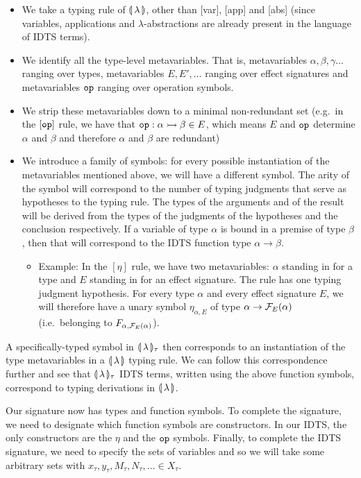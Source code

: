 \begin{itemize}
\item We take a typing rule of $\llparenthesis \, \lambda \, \rrparenthesis$, other than [var], [app]
  and [abs] (since variables, applications and $\lambda$-abstractions are
  already present in the language of IDTS terms).
\item We identify all the type-level metavariables. That is, metavariables
  $\alpha, \beta, \gamma \ldots$ ranging over types, metavariables
  $E, E', \ldots$ ranging over effect signatures and metavariables
  $\mathtt{op}$ ranging over operation symbols.
\item We strip these metavariables down to a minimal non-redundant set
  (e.g.\ in the $[\mathtt{op}]$ rule, we have that
  $\mathtt{op} : \alpha \rightarrowtail \beta \in E$, which means $E$ and $\mathtt{op}$
  determine $\alpha$ and $\beta$ and therefore $\alpha$ and $\beta$ are
  redundant)
\item We introduce a family of symbols: for every possible instantiation of
  the metavariables mentioned above, we will have a different symbol. The
  arity of the symbol will correspond to the number of typing judgments
  that serve as hypotheses to the typing rule. The types of the arguments
  and of the result will be derived from the types of the judgments of the
  hypotheses and the conclusion respectively. If a variable of type
  $\alpha$ is bound in a premise of type
  $\beta$, then that will correspond to the IDTS function type $\alpha \to
  \beta$.
  \begin{itemize}
  \item Example: In the $[\eta]$ rule, we have two metavariables: $\alpha$
    standing in for a type and $E$ standing in for an effect signature. The
    rule has one typing judgment hypothesis. For every type $\alpha$ and
    every effect signature $E$, we will therefore have a unary symbol
    $\eta_{\alpha, E}$ of type $\alpha \to \mathcal{F}_E(\alpha)$ (i.e.\ belonging
    to $F_{\alpha, \mathcal{F}_E(\alpha)}$).
  \end{itemize}
\end{itemize}

A specifically-typed symbol in $\llparenthesis \, \lambda \, \rrparenthesis_\tau$ then corresponds to
an instantiation of the type metavariables in a $\llparenthesis \, \lambda \, \rrparenthesis$ typing
rule. We can follow this correspondence further and see that
$\llparenthesis \, \lambda \, \rrparenthesis_\tau$ IDTS terms, written using the above function
symbols, correspond to typing derivations in $\llparenthesis \, \lambda \, \rrparenthesis$.

Our signature now has types and function symbols. To complete the
signature, we need to designate which function symbols are constructors. In
our IDTS, the only constructors are the $\eta$ and the $\mathtt{op}$
symbols. Finally, to complete the IDTS signature, we need to specify the
sets of variables and so we will take some arbitrary sets with $x_\tau,
y_\tau, M_\tau, N_\tau, \ldots \in X_\tau$.

